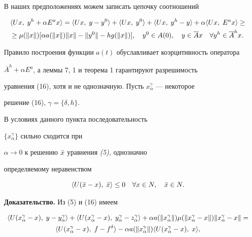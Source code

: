 В наших предположениях можем записать цепочку соотношений 


\begin{gather*} 


\la Ux,\;y^h+\alpha E^ax\ra =\la Ux,\;y-y^0\ra + 


\la Ux,\;y^0\ra +\la Ux,\;y^h-y\ra +\alpha\la Ux,\;E^ax\ra\ge \\ 


\ge\mu(\|x\|)[\alpha a(\|x\|)\|x\|-\|y^0\|-hg(\|x\|)], 


\quad y^0\in A(0),\quad y\in\overline Ax\quad \forall y^h\in\overline A^hx. 


\end{gather*} 


Правило построения функции $a(t)$ обуславливает коэрцитивность оператора 


$\overline A^h+\alpha E^a$, а леммы 7, 1 и теорема 1 гарантируют разрешимость 


уравнения (16), хотя и не однозначную. Пусть $x^\gamma_\alpha$ --- некоторое 


решение (16), $\gamma=\{\delta,h\}$. 


 


\begin{thm} В условиях данного пункта последовательность 


$\{x^\gamma_\alpha\}$ сильно сходится при \linebreak




$\alpha\to 0$ к решению $\Bar x$ уравнения {\em (5),} однозначно 


определяемому неравенством 


\begin{equation} 


\la U(\Bar x-x),\;\Bar x\ra \le 0 \quad \forall x\in N,\quad \Bar x\in N. 


\end{equation} 


\end{thm}


\medskip


 


{\bf Доказательство.} Из (5) и (16) имеем 


\begin{multline} 


\la U(x^\gamma_\alpha -x),\;y-y^\gamma_\alpha\ra + 


\la U(x^\gamma_\alpha-x),\;y^\gamma_\alpha-z^\gamma_\alpha\ra 


+ \alpha a(\|x^\gamma_\alpha\|)\mu(\|x^\gamma_\alpha-x\|) 


\|x^\gamma_\alpha-x\|= \\ 


\la U(x^\gamma_\alpha-x),\;f-f^\delta\ra - \alpha a(\|x^\gamma_\alpha\|) 


\la U(x^\gamma_\alpha-x),\;x\ra , 


\end{multline} 


